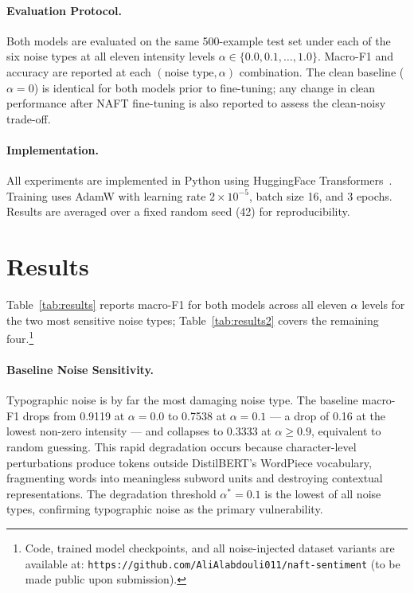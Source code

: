 \documentclass[sigconf]{acmart}
\begin{document}
\paragraph{Evaluation Protocol.}
Both models are evaluated on the same 500-example test set under
each of the six noise types at all eleven intensity levels
$\alpha \in \{0.0, 0.1, \ldots, 1.0\}$.
Macro-F1 and accuracy are reported at each $(\text{noise type},
\alpha)$ combination.
The clean baseline ($\alpha = 0$) is identical for both models
prior to fine-tuning; any change in clean performance after NAFT
fine-tuning is also reported to assess the clean-noisy trade-off.

\paragraph{Implementation.}
All experiments are implemented in Python using HuggingFace
Transformers~\cite{wolf2020transformers}.
Training uses AdamW with learning rate $2 \times 10^{-5}$, batch
size 16, and 3 epochs.
Results are averaged over a fixed random seed (42) for
reproducibility.

\section{Results}

Table~\ref{tab:results} reports macro-F1 for both models across
all eleven $\alpha$ levels for the two most sensitive noise types;
Table~\ref{tab:results2} covers the remaining four.\footnote{Code,
trained model checkpoints, and all noise-injected dataset variants
are available at:
\texttt{https://github.com/AliAlabdouli011/naft-sentiment}
(to be made public upon submission).}

\paragraph{Baseline Noise Sensitivity.}
Typographic noise is by far the most damaging noise type.
The baseline macro-F1 drops from 0.9119 at $\alpha=0.0$ to 0.7538
at $\alpha=0.1$ — a drop of 0.16 at the lowest non-zero intensity —
and collapses to 0.3333 at $\alpha \geq 0.9$, equivalent to
random guessing.
This rapid degradation occurs because character-level perturbations
produce tokens outside DistilBERT's WordPiece vocabulary,
fragmenting words into meaningless subword units and destroying
contextual representations.
The degradation threshold $\alpha^* = 0.1$ is the lowest of all
noise types, confirming typographic noise as the primary
vulnerability.
\end{document}
